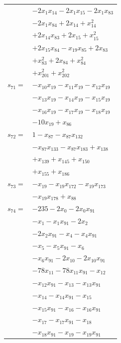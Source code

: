 \begin{longtable}{@{}r@{\;}l@{}}
 & \(\displaystyle -2x_{1}x_{14} -2x_{1}x_{15} -2x_{1}x_{83}\) \\
 & \(\displaystyle -2x_{1}x_{84} +2x_{14} +x_{14}^{2}\) \\
 & \(\displaystyle +2x_{14}x_{83} +2x_{15} +x_{15}^{2}\) \\
 & \(\displaystyle +2x_{15}x_{84} -x_{19}x_{85} +2x_{83}\) \\
 & \(\displaystyle +x_{83}^{2} +2x_{84} +x_{84}^{2}\) \\
 & \(\displaystyle +x_{201}^{2} +x_{202}^{2}\) \\[3pt]
\(s_{71}=\) & \(\displaystyle -x_{10}x_{19} -x_{11}x_{19} -x_{12}x_{19}\) \\
 & \(\displaystyle -x_{13}x_{19} -x_{14}x_{19} -x_{15}x_{19}\) \\
 & \(\displaystyle -x_{16}x_{19} -x_{17}x_{19} -x_{18}x_{19}\) \\
 & \(\displaystyle -10x_{19} +x_{86}\) \\[3pt]
\(s_{72}=\) & \(\displaystyle 1 -x_{87} -x_{87}x_{132}\) \\
 & \(\displaystyle -x_{87}x_{133} -x_{87}x_{183} +x_{138}\) \\
 & \(\displaystyle +x_{139} +x_{145} +x_{150}\) \\
 & \(\displaystyle +x_{155} +x_{186}\) \\[3pt]
\(s_{73}=\) & \(\displaystyle -x_{19} -x_{19}x_{172} -x_{19}x_{173}\) \\
 & \(\displaystyle -x_{19}x_{178} +x_{88}\) \\[3pt]
\(s_{74}=\) & \(\displaystyle -235 -2x_{0} -2x_{0}x_{91}\) \\
 & \(\displaystyle -x_{1} -x_{1}x_{91} -2x_{2}\) \\
 & \(\displaystyle -2x_{2}x_{91} -x_{4} -x_{4}x_{91}\) \\
 & \(\displaystyle -x_{5} -x_{5}x_{91} -x_{6}\) \\
 & \(\displaystyle -x_{6}x_{91} -2x_{10} -2x_{10}x_{91}\) \\
 & \(\displaystyle -78x_{11} -78x_{11}x_{91} -x_{12}\) \\
 & \(\displaystyle -x_{12}x_{91} -x_{13} -x_{13}x_{91}\) \\
 & \(\displaystyle -x_{14} -x_{14}x_{91} -x_{15}\) \\
 & \(\displaystyle -x_{15}x_{91} -x_{16} -x_{16}x_{91}\) \\
 & \(\displaystyle -x_{17} -x_{17}x_{91} -x_{18}\) \\
 & \(\displaystyle -x_{18}x_{91} -x_{19} -x_{19}x_{91}\) \\

\end{longtable}
